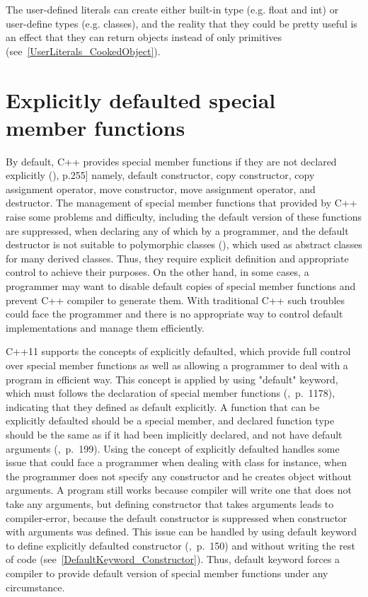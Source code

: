 \documentclass[11pt]{report}
\begin{document}
The user-defined literals can create either built-in type (e.g. float and int) or user-define types (e.g. classes), and the reality that they could be pretty useful is an effect that they can return objects instead of only primitives (see~\ref{UserLiterals_CookedObject}).


\section{Explicitly defaulted special member functions}
\label{section: Defaulted special member functions}
By default, C++ provides special member functions if they are not declared explicitly (\cite{ISO:2011:Cpplanguage}), p.255] namely, default constructor, copy constructor, copy assignment operator, move constructor, move assignment operator, and destructor. The management of special member functions that provided by C++ raise some problems and difficulty, including the default version of these functions are suppressed, when declaring any of which by a programmer, and the default destructor is not suitable to polymorphic classes (\cite{Stroustrup:2012:Cpp11}), which used as abstract classes for many derived classes. Thus, they require explicit definition and appropriate control to achieve their purposes. On the other hand, in some cases, a programmer may want to disable default copies of special member functions and prevent C++ compiler to generate them. With traditional C++ such troubles could face the programmer and there is no appropriate way to control default implementations and manage them efficiently.

C++11 supports the concepts of explicitly defaulted, which provide full control over special member functions as well as allowing a programmer to deal with a program in efficient way. This concept is applied by using "default" keyword, which must follows the declaration of special member functions (\cite{Prata:2012:Cpp},~p.~1178), indicating that they defined as default explicitly. A function that can be explicitly defaulted should be a special member, and declared function type should be the same as if it had been implicitly declared, and not have default arguments (\cite{ISO:2011:Cpplanguage},~p.~199). Using the concept of explicitly defaulted handles some issue that could face a programmer when dealing with class for instance, when the programmer does not specify any constructor and he creates object without arguments. A program still works because compiler will write one that does not take any arguments, but defining constructor that takes arguments leads to compiler-error, because the default constructor is suppressed when constructor with arguments was defined. This issue can be handled by using default keyword to define explicitly defaulted constructor (\cite{Gregorie:professionalcpp},~p.~150) and without writing the rest of code (see~\ref{DefaultKeyword_Constructor}). Thus, default keyword forces a compiler to provide default version of special member functions under any circumstance.
\end{document}
